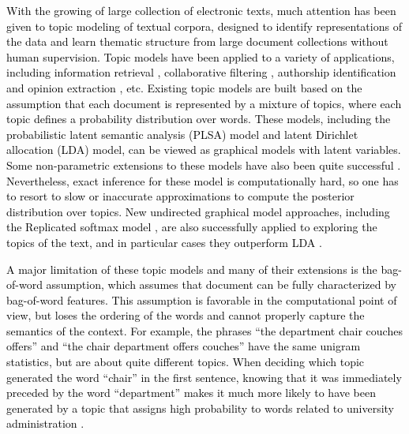 \documentclass[english,letter]{article}
\renewcommand\[{\begin{equation}}
\renewcommand\]{\end{equation}}
\begin{document}
\textcolor{black}{With the growing of large collection of electronic
texts, much attention has been given to topic modeling of textual
corpora, designed to identify representations of the data and learn
thematic structure from large document collections without human supervision.
Topic models have been applied to a variety of applications, including
information retrieval \cite{wei2006lda}, collaborative filtering
\cite{marlin2003modeling}, authorship identification \cite{rosen2004author}
and opinion extraction \cite{lin2012weakly}, etc. Existing topic
models \cite{griffiths2004hierarchical,mcauliffe2008supervised,blei2012probabilistic}
are built based on the assumption that each document is represented
by a mixture of topics, where each topic defines a probability distribution
over words. These models, including the probabilistic latent semantic
analysis (PLSA) \cite{hofmann1999probabilistic} model and latent
Dirichlet allocation (LDA) \cite{blei2003latent} model, can be viewed
as graphical models with latent variables. Some non-parametric extensions
to these models have also been quite successful \cite{teh2006hierarchical,steyvers2007probabilistic}.
Nevertheless, exact inference for these model is computationally hard,
so one has to resort to slow or inaccurate approximations to compute
the posterior distribution over topics. New undirected graphical model
approaches, including the Replicated softmax model \cite{hinton2009replicated},
are also successfully applied to exploring the topics of the text,
and in particular cases they outperform LDA \cite{srivastava2013modeling}. }

\textcolor{black}{A major limitation of these topic models and many
of their extensions is the bag-of-word assumption, which assumes that
document can be fully characterized by bag-of-word features. This
assumption is favorable in the computational point of view, but loses
the ordering of the words and cannot properly capture the semantics
of the context. For example, the phrases ``the department chair couches
offers'' and ``the chair department offers couches'' have the same
unigram statistics, but are about quite different topics. When deciding
which topic generated the word ``chair'' in the first sentence,
knowing that it was immediately preceded by the word ``department''
makes it much more likely to have been generated by a topic that assigns
high probability to words related to university administration \cite{wallach2006topic}. }
\end{document}
